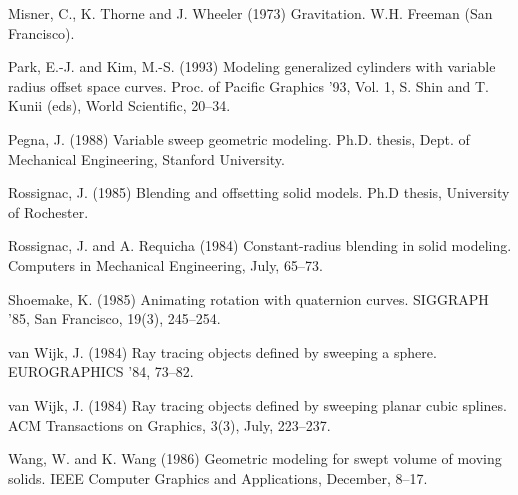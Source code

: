 \documentclass[times]{article}
\begin{document}
\begin{thebibliography}{Shoemake 85}
Misner, C., K. Thorne and J. Wheeler (1973)
Gravitation.  W.H. Freeman (San Francisco).

Park, E.-J. and Kim, M.-S. (1993)
Modeling generalized cylinders with variable radius offset space curves.
Proc. of Pacific Graphics '93, Vol. 1, S. Shin and T. Kunii (eds),
World Scientific, 20--34.

Pegna, J. (1988) Variable sweep geometric modeling.
Ph.D. thesis, Dept. of Mechanical Engineering, Stanford University.

Rossignac, J. (1985)
Blending and offsetting solid models.
Ph.D thesis, University of Rochester.

Rossignac, J. and A. Requicha (1984)
Constant-radius blending in solid modeling.
Computers in Mechanical Engineering, July, 65--73.


Shoemake, K. (1985) Animating rotation with quaternion curves.
SIGGRAPH '85, San Francisco, 19(3), 245--254.

van Wijk, J. (1984)
Ray tracing objects defined by sweeping a sphere.
EUROGRAPHICS '84, 73--82.

van Wijk, J. (1984)
Ray tracing objects defined by sweeping planar cubic splines.
ACM Transactions on Graphics, 3(3), July, 223--237.

Wang, W. and K. Wang (1986)
Geometric modeling for swept volume of moving solids.
IEEE Computer Graphics and Applications, December, 8--17.

\end{thebibliography}



\end{document}
